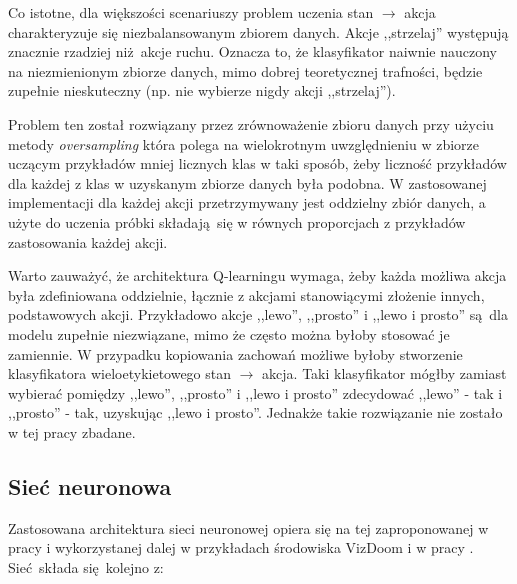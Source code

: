 Co istotne, dla większości scenariuszy problem uczenia stan $\to$ akcja charakteryzuje się niezbalansowanym zbiorem danych. Akcje ,,strzelaj'' występują znacznie rzadziej niż akcje ruchu. Oznacza to, że klasyfikator naiwnie nauczony na niezmienionym zbiorze danych, mimo dobrej teoretycznej trafności, będzie zupełnie nieskuteczny (np. nie wybierze nigdy akcji ,,strzelaj'').

Problem ten został rozwiązany przez zrównoważenie zbioru danych przy użyciu metody \textit{oversampling} która polega na wielokrotnym uwzględnieniu w zbiorze uczącym przykładów mniej licznych klas w taki sposób, żeby liczność przykładów dla każdej z klas w uzyskanym zbiorze danych była podobna. W zastosowanej implementacji dla każdej akcji przetrzymywany jest oddzielny zbiór danych, a użyte do uczenia próbki składają się w równych proporcjach z przykładów zastosowania każdej akcji. 

Warto zauważyć, że architektura Q-learningu wymaga, żeby każda możliwa akcja była zdefiniowana oddzielnie, łącznie z akcjami stanowiącymi złożenie innych, podstawowych akcji. Przykładowo akcje ,,lewo'', ,,prosto'' i ,,lewo i prosto'' są dla modelu zupełnie niezwiązane, mimo że często można byłoby stosować je zamiennie. W przypadku kopiowania zachowań możliwe byłoby stworzenie klasyfikatora  wieloetykietowego stan $\to$ akcja. Taki klasyfikator mógłby zamiast wybierać pomiędzy ,,lewo'', ,,prosto'' i ,,lewo i prosto'' zdecydować ,,lewo'' - tak i ,,prosto'' - tak, uzyskując ,,lewo i prosto''. Jednakże takie rozwiązanie nie zostało w tej pracy zbadane.


\subsection{Sieć neuronowa}\label{agent_net}

Zastosowana architektura sieci neuronowej opiera się na tej zaproponowanej w pracy \break \cite{mnih2015human} i wykorzystanej dalej w przykładach środowiska VizDoom i w pracy \break \cite{DBLP:journals/corr/KempkaWRTJ16}. Sieć składa się kolejno z:

